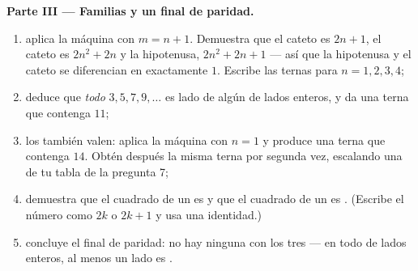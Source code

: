 \begin{problem}[{Problema de fin de semana --- triángulos rectángulos de lados enteros
y la identidad $(m^2 - n^2)^2 + (2mn)^2 = (m^2 + n^2)^2$ que
las genera todas}]
\medskip
\noindent\textbf{Parte III --- Familias y un final de paridad.}
\begin{enumerate}[resume]
  \item aplica la máquina con $m = n + 1$. Demuestra que el cateto  es
        $2n + 1$, el cateto  es $2n^2 + 2n$ y la hipotenusa,
        $2n^2 + 2n + 1$ --- así que la hipotenusa y el cateto  se diferencian en
        exactamente $1$. Escribe las ternas para $n = 1, 2, 3, 4$;
  \item deduce que \emph{todo}  $3, 5, 7, 9, \dots$
        es lado de algún  de lados enteros, y da
        una terna que contenga $11$;
  \item los  también valen: aplica la máquina con $n = 1$ y
        produce una terna que contenga $14$. Obtén después la misma
        terna por segunda vez, escalando una de tu tabla de la
        pregunta 7;
  \item demuestra que el cuadrado de un  es  y que
        el cuadrado de un  es . (Escribe el número como
        $2k$ o $2k + 1$ y usa una identidad.)
  \item concluye el final de paridad: no hay ninguna 
        con los tres  --- en todo 
        de lados enteros, al menos un lado es .
\end{enumerate}
\end{problem}
